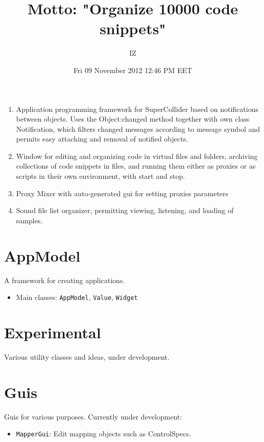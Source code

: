 \documentclass[11pt, a4paper]{scrartcl}
\begin{document}
\title{Motto: "Organize 10000 code snippets"}
\author{IZ}
\date{Fri 09 November 2012 12:46 PM EET}
\maketitle

\setcounter{tocdepth}{3}
\tableofcontents
\vspace*{1cm}


\begin{enumerate}
\item Application programming framework for SuperCollider based on notifications between objects. Uses the Object:changed method together with own class Notification, which filters changed messages according to message symbol and permits easy attaching and removal of notified objects.
\item Window for editing and organizing code in virtual files and folders, archiving collections of code snippets in files, and running them either as proxies or as scripts in their own environment, with start and stop.
\item Proxy Mixer with auto-generated gui for setting proxies parameters
\item Sound file list organizer, permitting viewing, listening, and loading of samples.
\end{enumerate}
\section{AppModel}
\label{sec-1}


A framework for creating applications. 

\begin{itemize}
\item Main classes: \texttt{AppModel}, \texttt{Value}, \texttt{Widget}
\end{itemize}
\section{Εxperimental}
\label{sec-2}


Various utility classes and ideas, under development.
\section{Guis}
\label{sec-3}


Guis for various purposes. Currently under development: 

\begin{itemize}
\item \texttt{MapperGui}: Edit mapping objects such as ControlSpecs.
\end{itemize}
\end{document}
